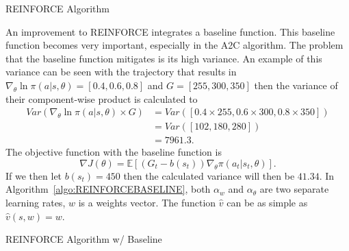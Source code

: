 \begin{algorithm}
	\SetAlgoLined
	\DontPrintSemicolon
	\caption{REINFORCE Algorithm}
\end{algorithm}

An improvement to REINFORCE integrates a baseline function. This baseline function becomes very important, especially in the A2C algorithm. The problem that the baseline function mitigates is its high variance. An example of this variance can be seen with the trajectory that results in $\nabla_\theta \ln \pi(a|s, \theta)=[0.4, 0.6, 0.8]$ and $G=[255, 300, 350]$ then the variance of their component-wise product is calculated to 
\begin{align*}
	Var(\nabla_\theta \ln \pi(a|s, \theta)\times G)&=Var([0.4\times 255, 0.6\times 300, 0.8\times 350])\\
	&=Var([102, 180, 280])\\
	&=7961.3.
\end{align*} The objective function with the baseline function is $$\nabla J(\theta)=\mathbb{E}[(G_t-b(s_t))\nabla_\theta \pi (a_t|s_t, \theta)].$$ If we then let $b(s_t)=450$ then the calculated variance will then be $41.34$. In Algorithm~\ref{algo:REINFORCEBASELINE}, both $\alpha_w$ and $\alpha_\theta$ are two separate learning rates, $w$ is a weights vector. The function $\hat{v}$ can be as simple as $\hat{v}(s, w)=w$.

\begin{algorithm}\label{algo:REINFORCEBASELINE}
	\SetAlgoLined
	\DontPrintSemicolon
	
	\caption{REINFORCE Algorithm w/ Baseline}
\end{algorithm}

